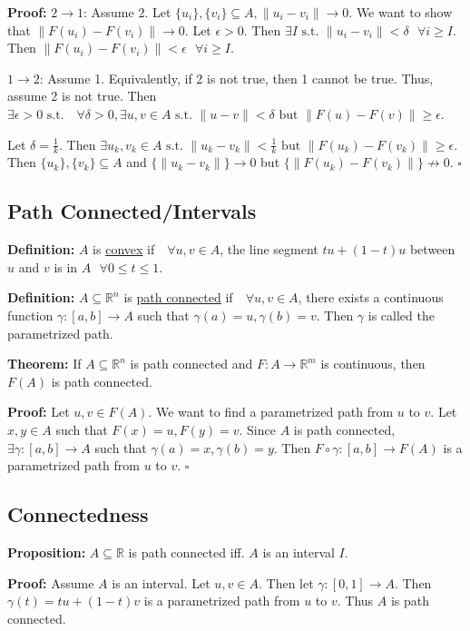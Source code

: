 \documentclass{article}
\newcommand*{\qed}{\hfill$\square$}%
\newcommand*{\txt}[1]{\text{ #1 }}%
\newcommand*{\fora}{\txt{}\forall}%
\newcommand*{\rr}{\mathbb{R}}%
\begin{document}
\textbf{Proof:} $2\to 1$: Assume 2. Let $\{u_i\},\{v_i\}\subseteq A,\|u_i-v_i\|\to 0$. We want to show that $\|F(u_i)-F(v_i)\|\to 0$. Let $\epsilon>0$. Then $\exists I\txt{s.t.}\|u_i-v_i\|<\delta\fora i\geq I$. Then $\|F(u_i)-F(v_i)\|<\epsilon\fora i\geq I$. 

$1\to 2$: Assume 1. Equivalently, if 2 is not true, then 1 cannot be true. Thus, assume 2 is not true. Then $\exists \epsilon>0\txt{s.t.}\fora \delta>0,\exists u,v\in A\txt{s.t.}\|u-v\|<\delta\txt{but}\|F(u)-F(v)\|\geq \epsilon$. 

Let $\delta=\frac{1}{k}$. Then $\exists u_k,v_k\in A\txt{s.t.}\|u_k-v_k\|<\frac{1}{k}\txt{but}\|F(u_k)-F(v_k)\|\geq \epsilon$. Then $\{u_k\},\{v_k\}\subseteq A$ and $\{\|u_k-v_k\|\}\to 0$ but $\{\|F(u_k)-F(v_k)\|\}\not\to 0$. \qed 

\subsection{Path Connected/Intervals}

\textbf{Definition:} $A$ is \underline{convex} if $\fora u,v\in A$, the line segment $tu+(1-t)u$ between $u$ and $v$ is in $A \fora 0\leq t\leq 1$.

\textbf{Definition:} $A\subseteq \rr^n$ is \underline{path connected} if $\fora u,v\in A$, there exists a continuous function $\gamma:[a,b]\to A$ such that $\gamma(a)=u,\gamma(b)=v$. Then $\gamma$ is called the parametrized path.

\textbf{Theorem:} If $A\subseteq \rr^n$ is path connected and $F:A\to\rr^m$ is continuous, then $F(A)$ is path connected.

\textbf{Proof:} Let $u,v\in F(A)$. We want to find a parametrized path from $u$ to $v$. Let $x,y\in A$ such that $F(x)=u,F(y)=v$. Since $A$ is path connected, $\exists \gamma:[a,b]\to A$ such that $\gamma(a)=x,\gamma(b)=y$. Then $F\circ \gamma:[a,b]\to F(A)$ is a parametrized path from $u$ to $v$. \qed

\subsection{Connectedness}

\textbf{Proposition:} $A\subseteq \rr$ is path connected iff. $A$ is an interval $I$.

\textbf{Proof:} Assume $A$ is an interval. Let $u,v\in A$. Then let $\gamma:[0,1]\to A$. Then $\gamma(t)=tu+(1-t)v$ is a parametrized path from $u$ to $v$. Thus $A$ is path connected.
\end{document}
